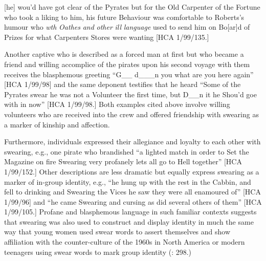 [he] wou’d have got clear of the Pyrates but for the Old Carpenter of the Fortune who took a liking to him, his future Behaviour was comfortable to Roberts’s humour who \textit{wth} \textit{Oathes} \textit{and} \textit{other} \textit{ill} \textit{language} used to send him on Bo[ar]d of Prizes for what Carpenters Stores were wanting [HCA 1/99/135.] 

Another captive who is described as a forced man at first but who became a friend and willing accomplice of the pirates upon his second voyage with them receives the blasphemous greeting “G\_\_ d\_\_\_n you what are you here again” [HCA 1/99/98] and the same deponent testifies that he heard “Some of the Pyrates swear he was not a Volunteer the first time, but D\_\_n it he Shou’d goe with in now” [HCA 1/99/98.] Both examples cited above involve willing volunteers who are received into the crew and offered friendship with swearing as a marker of kinship and affection. 

Furthermore, individuals expressed their allegiance and loyalty to each other with swearing, e.g., one pirate who brandished “a lighted match in order to Set the Magazine on fire Swearing very profanely lets all go to Hell together” [HCA 1/99/152.] Other descriptions are less dramatic but equally express swearing as a marker of in-group identity, e.g., “he hung up with the rest in the Cabbin, and fell to drinking and Swearing the Vices he saw they were all enamoured of” [HCA 1/99/96] and “he came Swearing and cursing as did several others of them” [HCA 1/99/105.] Profane and blasphemous language in such familiar contexts suggests that swearing was also used to construct and display identity in much the same way that young women used swear words to assert themselves and show affiliation with the counter-culture of the 1960s in North America \citep[60]{Carlisle2009} or modern teenagers using swear words to mark group identity (\citealt{Stapleton2010}: 298.) 

